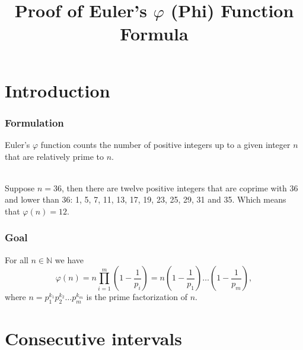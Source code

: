\documentclass[envcountsect]{beamer}
\author[Emils Kalugins]{Presented by Emils Kalugins \\~\\
{\small Paper\footnotemark{} authored by:\\ Shashank Chorge\footnotemark{} \and Juan Vargas\footnotemark{}}}
\title{Proof of Euler's $\varphi$ (Phi) Function Formula}
\institute{Univesity of Latvia}
\begin{document}
\begin{frame}
\maketitle


\end{frame}

\section{Introduction}

\begin{frame}

\frametitle{Formulation}

Euler's $\varphi$ function counts the number of positive integers up to a given
integer $n$ that are relatively prime to $n$. \\~\\ 


\begin{example}
Suppose $n = 36$, then there are twelve positive integers that are coprime with 36
and lower than 36: 1, 5, 7, 11, 13, 17, 19, 23, 25, 29, 31 and 35. Which means
that $\varphi(n) = 12$. 
\end{example}

\end{frame}

\begin{frame}
\frametitle{Goal}

\begin{theorem}
For all $n \in \mathbb{N}$ we have $$ \varphi(n) = n\prod_{i=1}^m
\left(1-\frac{1}{p_i}\right) = n\left(1-\frac{1}{p_1}\right) \dots
\left(1-\frac{1}{p_m} \right), $$ 
where $n = p_1^{k_1}p_2^{k_2}\dots p_m^{k_m} $ is the prime
factorization of $n$.
\end{theorem}

\end{frame}

\section{Consecutive intervals}
\end{document}
